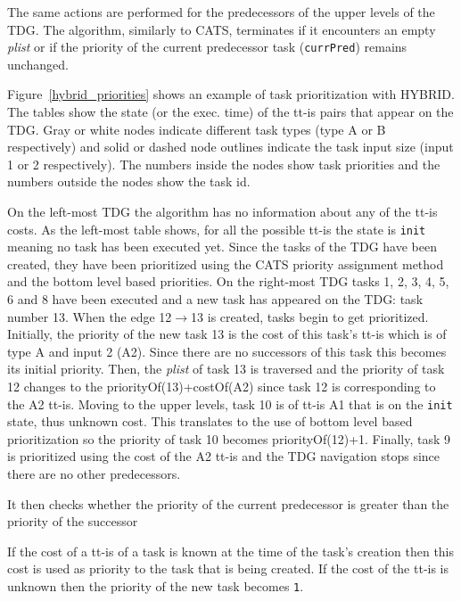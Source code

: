 The same actions are performed for the predecessors of the upper levels of the TDG.
The algorithm, similarly to CATS, terminates if it encounters an empty \textit{plist} or if the priority of the current predecessor task (\texttt{currPred}) remains unchanged.


Figure~\ref{hybrid_priorities} shows an example of task prioritization with HYBRID.
The tables show the state (or the exec. time) of the tt-is pairs that appear on the TDG.
Gray or white nodes indicate different task types (type A or B respectively) and solid or dashed node outlines indicate the task input size (input 1 or 2 respectively).
The numbers inside the nodes show task priorities and the numbers outside the nodes show the task id.

On the left-most TDG the algorithm has no information about any of the tt-is costs.
As the left-most table shows, for all the possible tt-is the state is \texttt{init} meaning no task has been executed yet.
Since the tasks of the TDG have been created, they have been prioritized using the CATS priority assignment method and the bottom level based priorities.
On the right-most TDG tasks 1, 2, 3, 4, 5, 6 and 8 have been executed and a new task has appeared on the TDG: task number 13.
When the edge 12$\rightarrow$13 is created, tasks begin to get prioritized.
Initially, the priority of the new task 13 is the cost of this task's tt-is which is of type A and input 2 (A2). 
Since there are no successors of this task this becomes its initial priority.
Then, the \textit{plist} of task 13 is traversed and the priority of task 12 changes to the priorityOf(13)+costOf(A2) since task 12 is corresponding to the A2 tt-is.
Moving to the upper levels, task 10 is of tt-is A1 that is on the \texttt{init} state, thus unknown cost.
This translates to the use of bottom level based prioritization so the priority of task 10 becomes priorityOf(12)+1.
Finally, task 9 is prioritized using the cost of the A2 tt-is and the TDG navigation stops since there are no other predecessors.
\fi

It then checks whether the priority of the current predecessor is greater than the priority of the successor





If the cost of a tt-is of a task is known at the time of the task's creation then this cost is used as priority to the task that is being created.
If the cost of the tt-is is unknown then the priority of the new task becomes \texttt{1}.

